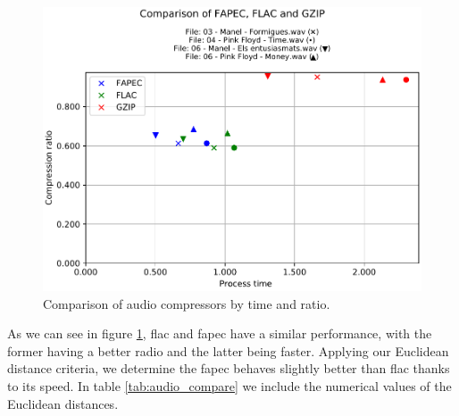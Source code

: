 \begin{figure}[h!]
	\begin{center}
		\includegraphics[scale=0.69]{images/2021-05-30T22:30:32.186296-results_wave.csv_comparison.pdf}
	\end{center}
	\caption{Comparison of audio compressors by time and ratio.}
	\label{fig:audio_compare}
\end{figure}

As we can see in figure \ref{fig:audio_compare}, \acrshort{flac} and \acrshort{fapec} have a similar performance, with the former having a better radio and the latter being faster. Applying our Euclidean distance criteria, we determine the \acrshort{fapec} behaves slightly better than \acrshort{flac} thanks to its speed. In table \ref{tab:audio_compare} we include the numerical values of the Euclidean distances.

